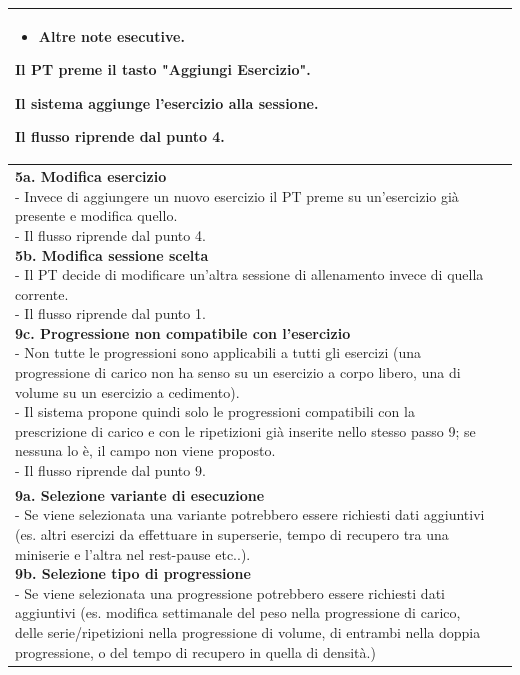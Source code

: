\documentclass[../../../../SoftwareRequirementsSpecification.tex]{subfiles}
\begin{document}
\begin{tabularx}{\textwidth}{|l|X|}
{\begin{itemize}
        \item Altre note esecutive.
      \end{itemize}
    \item Il PT preme il tasto "Aggiungi Esercizio".
    \item Il sistema aggiunge l'esercizio alla sessione.
    \item Il flusso riprende dal punto 4.
  } \\ \hline
  \ucaltflow{
    \textbf{5a. Modifica esercizio} \newline
    - Invece di aggiungere un nuovo esercizio il PT preme su
    un'esercizio già presente e modifica quello. \newline
    - Il flusso riprende dal punto 4. \newline
    \textbf{5b. Modifica sessione scelta} \newline
    - Il PT decide di modificare un'altra sessione di
    allenamento invece di quella corrente.\newline
    - Il flusso riprende dal punto 1.\newline
    \textbf{9c. Progressione non compatibile con l'esercizio} \newline
    - Non tutte le progressioni sono applicabili a tutti gli esercizi
    (una progressione di carico non ha senso su un esercizio a corpo
    libero, una di volume su un esercizio a cedimento). \newline
    - Il sistema propone quindi solo le progressioni compatibili con
    la prescrizione di carico e con le ripetizioni già inserite nello
    stesso passo 9; se nessuna lo è, il campo non viene
    proposto. \newline
    - Il flusso riprende dal punto 9.
  } \\ \hline
  \ucvariations{
    \textbf{9a. Selezione variante di esecuzione} \newline
    - Se viene selezionata una variante potrebbero essere richiesti dati
    aggiuntivi (es. altri esercizi da effettuare in superserie, tempo di recupero
    tra una miniserie e l'altra nel rest-pause etc..).\newline
    \textbf{9b. Selezione tipo di progressione}\newline
    - Se viene selezionata una progressione potrebbero essere richiesti
    dati aggiuntivi (es. modifica settimanale del peso nella
      progressione di carico, delle serie/ripetizioni nella
      progressione di volume, di entrambi nella doppia progressione, o
    del tempo di recupero in quella di densità.)
}
\end{tabularx}
\end{document}
